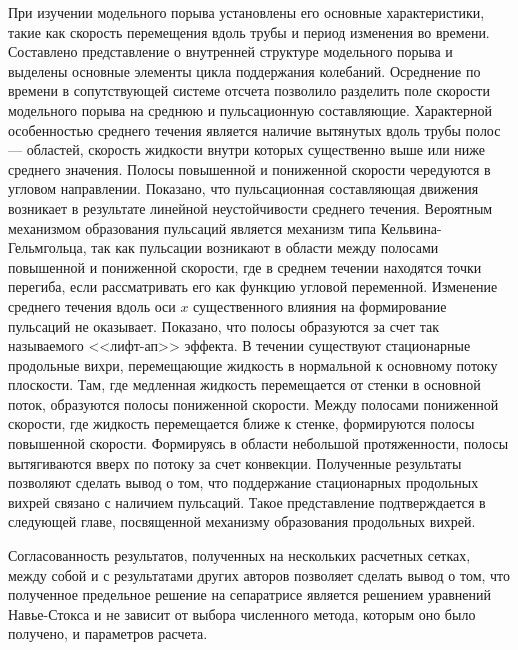 При изучении модельного порыва установлены его основные характеристики, такие как скорость перемещения вдоль трубы и период изменения во времени. Составлено представление о внутренней структуре модельного порыва и выделены основные элементы цикла поддержания колебаний. Осреднение по времени в сопутствующей системе отсчета позволило разделить поле скорости модельного порыва на среднюю и пульсационную составляющие. Характерной особенностью среднего течения является наличие вытянутых вдоль трубы полос --- областей, скорость жидкости внутри которых существенно выше или ниже среднего значения. Полосы повышенной и пониженной скорости чередуются в угловом направлении. Показано, что пульсационная составляющая движения возникает в результате линейной неустойчивости среднего течения. Вероятным механизмом образования пульсаций является механизм типа Кельвина-Гельмгольца, так как пульсации возникают в области между полосами повышенной и пониженной скорости, где в среднем течении находятся точки перегиба, если рассматривать его как функцию угловой переменной. Изменение среднего течения вдоль оси $x$ существенного влияния на формирование пульсаций не оказывает. Показано, что полосы образуются за счет так называемого <<лифт-ап>> эффекта. В течении существуют стационарные продольные вихри, перемещающие жидкость в нормальной к основному потоку плоскости. Там, где медленная жидкость перемещается от стенки в основной поток, образуются полосы пониженной скорости. Между полосами пониженной скорости, где жидкость перемещается ближе к стенке, формируются полосы повышенной скорости. Формируясь в области небольшой протяженности, полосы вытягиваются вверх по потоку за счет конвекции. Полученные результаты позволяют сделать вывод о том, что поддержание стационарных продольных вихрей связано с наличием пульсаций. Такое представление подтверждается в следующей главе, посвященной механизму образования продольных вихрей.

Согласованность результатов, полученных на нескольких расчетных сетках, между собой и с результатами других авторов позволяет сделать вывод о том, что полученное предельное решение на сепаратрисе является решением уравнений Навье-Стокса и не зависит от выбора численного метода, которым оно было получено, и параметров расчета.

